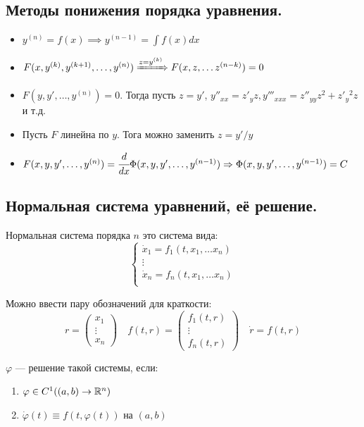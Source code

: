 \subsection*{Методы понижения порядка уравнения.}

\begin{itemize}
    \item \(y^{(n)} = f(x) \implies y^{(n - 1)} = \int f(x) dx\)
    \item \(F(x, y^{(k)}, y^{(k + 1)}, \dots , y^{(n)}) \xRightarrow{z = y^{(k)}} F(x, z, \dots z^{(n - k)}) = 0\)
    \item \(F(y, y', \dots , y^{(n)}) = 0\). Тогда пусть \(z = y'\), \(y''_{xx} = z'_y z, y'''_{x x x} = z''_{yy} z^2 + z'_y{^2} z\) и т.д.
    \item Пусть \(F\) линейна по \(y\). Тога можно заменить \(z = y'/y\)
    \item \(F(x, y, y', \dots , y^{(n)}) = \cfrac{d}{dx} \Phi(x, y, y', \dots , y^{(n - 1)}) \Rightarrow \Phi(x, y, y', \dots , y^{(n - 1)}) = C\)
\end{itemize}

\subsection*{Нормальная система уравнений, её решение.}

Нормальная система порядка \(n\) это система вида:
\[\begin{cases}
        \dot{x}_1 = f_1(t, x_1, \dots x_n) \\
        \vdots                             \\
        \dot{x}_n = f_n(t, x_1, \dots x_n) \\
    \end{cases}\]

Можно ввести пару обозначений для краткости:
\[r = \begin{pmatrix} x_1 \\ \vdots \\ x_n \end{pmatrix} \quad f(t, r) = \begin{pmatrix} f_1(t, r) \\ \vdots \\ f_n(t, r) \end{pmatrix} \quad \dot{r} = f(t, r)\]

\(\varphi\) --- решение такой системы, если:
\begin{enumerate}
    \item \(\varphi \in C^1((a, b) \to \mathbb{R}^n)\)
    \item \(\dot \varphi(t) \equiv f(t, \varphi(t))\) на \((a, b)\)
\end{enumerate}

